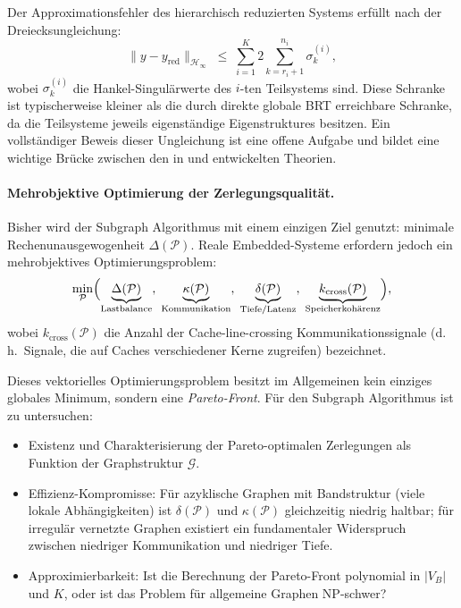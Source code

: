 ﻿\documentclass[12pt,a4paper]{article}
\theoremstyle{definition}
\begin{document}
Der Approximationsfehler des hierarchisch reduzierten Systems
erfüllt nach der Dreiecksungleichung:
\[
  \|y - y_{\mathrm{red}}\|_{\mathcal{H}_\infty}
  \;\leq\; \sum_{i=1}^K
  2 \sum_{k=r_i+1}^{n_i} \sigma_k^{(i)},
\]
wobei $\sigma_k^{(i)}$ die Hankel-Singulärwerte des $i$-ten
Teilsystems sind. Diese Schranke ist typischerweise kleiner als
die durch direkte globale BRT erreichbare Schranke, da die
Teilsysteme jeweils eigenständige Eigenstruktures besitzen.
Ein vollständiger Beweis dieser Ungleichung ist eine offene Aufgabe
und bildet eine wichtige Brücke zwischen den in 
und  entwickelten Theorien.

\paragraph{Mehrobjektive Optimierung der Zerlegungsqualität.}
Bisher wird der Subgraph Algorithmus mit einem einzigen Ziel genutzt:
minimale Rechenunausgewogenheit $\Delta(\mathcal{P})$. Reale
Embedded-Systeme erfordern jedoch ein mehrobjektives Optimierungsproblem:
\[
  \min_{\mathcal{P}} \Bigl(
    \underbrace{\Delta(\mathcal{P})}_{\text{Lastbalance}},\;
    \underbrace{\kappa(\mathcal{P})}_{\text{Kommunikation}},\;
    \underbrace{\delta(\mathcal{P})}_{\text{Tiefe/Latenz}},\;
    \underbrace{k_{\mathrm{cross}}(\mathcal{P})}_{\text{Speicherkohärenz}}
  \Bigr),
\]
wobei $k_{\mathrm{cross}}(\mathcal{P})$ die Anzahl der Cache-line-crossing
Kommunikationssignale (d.\,h.\ Signale, die auf Caches verschiedener
Kerne zugreifen) bezeichnet.

Dieses vektorielles Optimierungsproblem besitzt im Allgemeinen kein
einziges globales Minimum, sondern eine \emph{Pareto-Front}.
Für den Subgraph Algorithmus ist zu untersuchen:

\begin{itemize}[nosep]
  \item Existenz und Charakterisierung der Pareto-optimalen Zerlegungen
        als Funktion der Graphstruktur $\mathcal{G}$.
  \item Effizienz-Kompromisse: Für azyklische Graphen mit
        Bandstruktur (viele lokale Abhängigkeiten) ist
        $\delta(\mathcal{P})$ und $\kappa(\mathcal{P})$ gleichzeitig
        niedrig haltbar; für irregulär vernetzte Graphen existiert
        ein fundamentaler Widerspruch zwischen niedriger
        Kommunikation und niedriger Tiefe.
  \item Approximierbarkeit: Ist die Berechnung der Pareto-Front
        polynomial in $|V_B|$ und $K$, oder ist das Problem für
        allgemeine Graphen NP-schwer?
\end{itemize}
\end{document}
